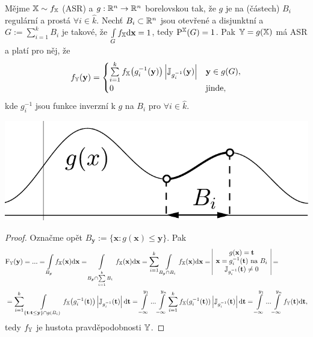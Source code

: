 \begin{theorem}
	Mějme $\mathbb{X}\sim f_{\mathbb{X}}$ (ASR) a $g:\mathbb{R}^n\to\mathbb{R}^n$ borelovskou tak, že $g$ je na (částech) $B_i$ regulární a prostá $\forall i \in \hat{k}$. Nechť $B_i\subset \mathbb{R}^n$ jsou otevřené a disjunktní a $G:=\sum\limits_{i=1}^k B_i$ je takové, že $\int\limits_{G}f_{\mathbb{X}} \mathrm{d}\textbf{x}=1$, tedy $\mathrm{P}^{\mathbb{X}}(G)=1$. Pak $\mathbb{Y} =g(\mathbb{X})$ má ASR a platí pro něj, že
	$$f_\mathbb{Y}(\textbf{y})=\begin{cases}
	\sum\limits_{i=1}^k f_{\mathbb{X}}\bigl(g_i^{-1}(\textbf{y})\bigr)\left| \mathbb{J}_{g_i^{-1}}(\textbf{y}) \right| &\textbf{y}\in g(G), \\ 0 & \text{jinde,}
	\end{cases}$$
	  kde $g_i^{-1}$ jsou funkce inverzní k $g$ na $B_i$ pro $\forall i\in\hat{k}$.
	\begin{center}
		\includegraphics[width=0.24\linewidth]{opendiscret}
	\end{center}
	\begin{proof}Označme opět $B_\textbf{y}:=\{ \textbf{x}:g(\textbf{x})\leq \textbf{y} \}$. Pak
		\[
		\begin{split}
		&\mathrm{F}_\mathbb{Y}(\textbf{y})=... =\int\limits_{B_\textbf{y}}f_{\mathbb{X}}(\textbf{x})\mathrm{d}\textbf{x} =\int\limits_{B_\textbf{y}\cap \sum\limits_{i=1}^k B_i}f_{\mathbb{X}}(\textbf{x})\mathrm{d}\textbf{x}=\sum\limits_{i=1}^k \int\limits_{B_\textbf{y}\cap B_i} f_{\mathbb{X}}(\textbf{x}) \mathrm{d}\textbf{x}= \begin{array}{|c|}
		 g(\textbf{x})=\textbf{t}\\ 
		\textbf{x}=g_i^{-1}(\textbf{t})\text{ na }B_i\\ 
		\mathbb{J}_{g_i^{-1}}(\textbf{t})\neq 0
		\end{array} = \\
		&= \sum\limits_{i=1}^k \int\limits_{\{ \textbf{t}:\textbf{t}\leq \textbf{y} \}\cap g(B_i)}f_{\mathbb{X}}\bigl(g_i^{-1}(\textbf{t})\bigr)\left| \mathbb{J}_{g_i^{-1}}(\textbf{t}) \right|\mathrm{d}\textbf{t}=\int\limits_{-\infty}^{y_1}... \int\limits_{-\infty}^{y_n}\sum\limits_{i=1}^k f_{\mathbb{X}}(g_i^{-1}(\textbf{t}))\left| \mathbb{J}_{g_i^{-1}}(\textbf{t}) \right|\mathrm{d}\textbf{t}=\int\limits_{-\infty}^{y_1}... \int\limits_{-\infty}^{y_n}f_\mathbb{Y}(\textbf{t})\mathrm{d}\textbf{t} ,
		\end{split}
		\]
		tedy $f_\mathbb{Y}$ je hustota pravděpodobnosti $\mathbb{Y}$.
	\end{proof}
\end{theorem}
